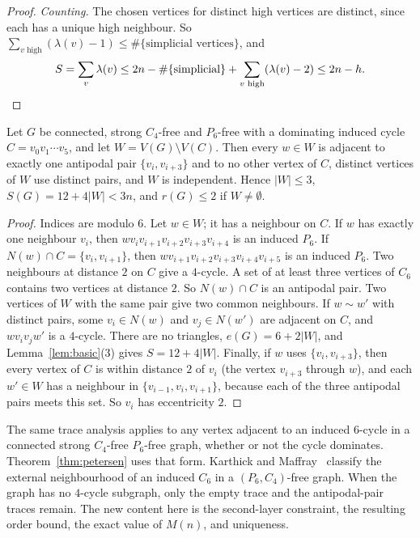 \documentclass[ASNA]{USG}
\theoremstyle{WBstyletwo}
\numberwithin{equation}{section}
\begin{document}
\begin{proof}
\emph{Counting.} The chosen vertices for distinct high vertices are distinct, since each has a unique high neighbour. So $\sum_{v\text{ high}}(\lambda(v)-1)\le\#\{\text{simplicial vertices}\}$, and
\[
S=\sum_v\lambda(v)\le 2n-\#\{\text{simplicial}\}+\sum_{v\text{ high}}(\lambda(v)-2)\le 2n-h.\qedhere
\]
\end{proof}

\begin{lemma}\label{lem:c6}
Let $G$ be connected, strong $C_4$-free and $P_6$-free with a dominating induced cycle $C=v_0v_1\cdots v_5$, and let $W=V(G)\setminus V(C)$. Then every $w\in W$ is adjacent to exactly one antipodal pair $\{v_i,v_{i+3}\}$ and to no other vertex of $C$, distinct vertices of $W$ use distinct pairs, and $W$ is independent. Hence $|W|\le 3$, $S(G)=12+4|W|<3n$, and $r(G)\le 2$ if $W\ne\emptyset$.
\end{lemma}

\begin{proof}
Indices are modulo $6$. Let $w\in W$; it has a neighbour on $C$. If $w$ has exactly one neighbour $v_i$, then $wv_iv_{i+1}v_{i+2}v_{i+3}v_{i+4}$ is an induced $P_6$. If $N(w)\cap C=\{v_i,v_{i+1}\}$, then $wv_{i+1}v_{i+2}v_{i+3}v_{i+4}v_{i+5}$ is an induced $P_6$. Two neighbours at distance $2$ on $C$ give a $4$-cycle. A set of at least three vertices of $C_6$ contains two vertices at distance $2$. So $N(w)\cap C$ is an antipodal pair. Two vertices of $W$ with the same pair give two common neighbours. If $w\sim w'$ with distinct pairs, some $v_i\in N(w)$ and $v_j\in N(w')$ are adjacent on $C$, and $wv_iv_jw'$ is a $4$-cycle. There are no triangles, $e(G)=6+2|W|$, and Lemma~\ref{lem:basic}(3) gives $S=12+4|W|$. Finally, if $w$ uses $\{v_i,v_{i+3}\}$, then every vertex of $C$ is within distance $2$ of $v_i$ (the vertex $v_{i+3}$ through $w$), and each $w'\in W$ has a neighbour in $\{v_{i-1},v_i,v_{i+1}\}$, because each of the three antipodal pairs meets this set. So $v_i$ has eccentricity $2$.
\end{proof}

The same trace analysis applies to any vertex adjacent to an induced $6$-cycle in a connected strong $C_4$-free $P_6$-free graph, whether or not the cycle dominates. Theorem~\ref{thm:petersen} uses that form. Karthick and Maffray~\cite[Theorem~3.3]{km} classify the external neighbourhood of an induced $C_6$ in a $(P_6,C_4)$-free graph. When the graph has no $4$-cycle subgraph, only the empty trace and the antipodal-pair traces remain. The new content here is the second-layer constraint, the resulting order bound, the exact value of $M(n)$, and uniqueness.
\end{document}

